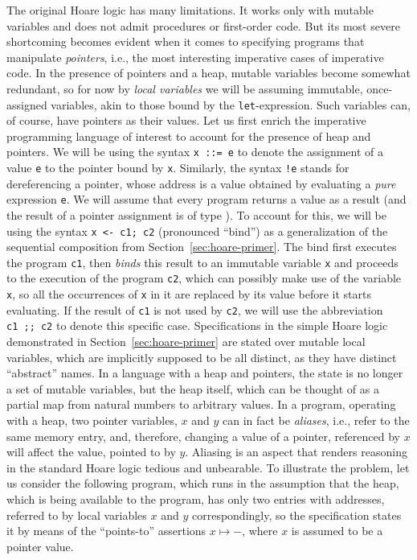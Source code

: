 \label{sec:seplog}
The original Hoare logic has many limitations. It works only with
mutable variables and does not admit procedures or first-order
code. But its most severe shortcoming becomes evident when it
comes to specifying programs that manipulate \textit{pointers}, i.e.,
the most interesting imperative cases of imperative
code.  In the presence of pointers and a heap,
mutable variables become somewhat redundant, so for now by \textit{local
variables} we will be assuming immutable, once-assigned variables,
akin to those bound by the \texttt{let}-expression. Such variables
can, of course, have pointers as their values.
Let us first enrich the imperative programming language of interest to
account for the presence of heap and pointers. We will be using the
syntax \texttt{x ::= e} to denote the assignment of a value
\texttt{e} to the pointer bound by \texttt{x}. Similarly, the
syntax \texttt{!e} stands for dereferencing a pointer, whose address
is a value obtained by evaluating a \textit{pure} expression \texttt{e}. We
will assume that every program returns a value as a result (and the
result of a pointer assignment is of type ). To account for
this, we will be using the syntax \texttt{x~<-~c1;~c2} (pronounced
``bind'') as a generalization of the sequential composition from
Section~\ref{sec:hoare-primer}. The bind first executes the program
\texttt{c1}, then \textit{binds} this  result to an
immutable variable \texttt{x} and proceeds to the execution of the
program \texttt{c2}, which can possibly make use of the variable
\texttt{x}, so all the occurrences of \texttt{x} in it are
replaced by its value before it starts evaluating. If the result of
\texttt{c1} is not used by \texttt{c2}, we will use the
abbreviation \texttt{c1~;;~c2} to denote this specific case.
Specifications in the simple Hoare logic demonstrated in
Section~\ref{sec:hoare-primer} are stated over mutable local
variables, which are implicitly supposed to be all distinct, as they
have distinct ``abstract'' names. In a language with a heap and
pointers, the state is no longer a set of mutable variables, but the
heap itself, which  can be thought of as a partial map
from natural numbers to arbitrary values. In a program, operating with
a heap, two pointer variables, $x$ and $y$ can in fact be \textit{aliases},
 i.e., refer to the same memory entry, and,
therefore, changing a value of a pointer, referenced by $x$ will
affect the value, pointed to by $y$. Aliasing is an aspect that
renders reasoning in the standard Hoare logic tedious and
unbearable. To illustrate the problem, let us consider the following
program, which runs in the assumption that the heap, which is being
available to the program, has only two entries with addresses,
referred to by local variables $x$ and $y$ correspondingly, so the
specification states it by means of the ``points-to'' assertions $x
\mapsto -$, where $x$ is assumed to be a pointer value.

